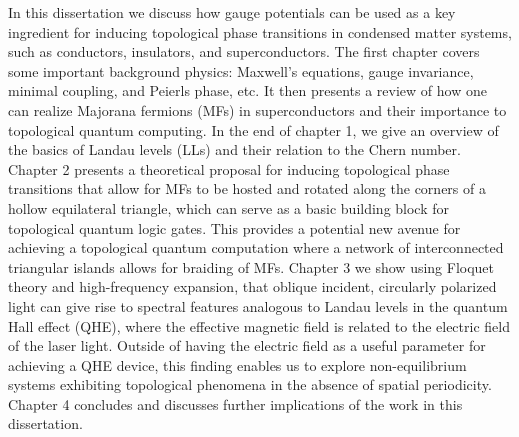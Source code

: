 In this dissertation we discuss how gauge potentials can be used as a key ingredient for inducing topological phase transitions in condensed matter systems, such as conductors, insulators, and superconductors.
The first chapter covers some important background physics: Maxwell's equations, gauge invariance, minimal coupling, and Peierls phase, etc.
It then presents a review of how one can realize Majorana fermions (MFs) in superconductors and their importance to topological quantum computing.
In the end of chapter 1, we give an overview of the basics of Landau levels (LLs) and their relation to the Chern number.
Chapter 2 presents a theoretical proposal for inducing topological phase transitions that allow for MFs to be hosted and rotated along the corners of a hollow equilateral triangle, which can serve as a basic building block for topological quantum logic gates.
This provides a potential new avenue for achieving a topological quantum computation where a network of interconnected triangular islands allows for braiding of MFs.
Chapter 3 we show using Floquet theory and high-frequency expansion, that oblique incident, circularly polarized light can give rise to spectral features analogous to Landau levels in the quantum Hall effect (QHE), where the effective magnetic field is related to the electric field of the laser light.
Outside of having the electric field as a useful parameter for achieving a QHE device, this finding enables us to explore non-equilibrium systems exhibiting topological phenomena in the absence of spatial periodicity.
Chapter 4 concludes and discusses further implications of the work in this dissertation.
